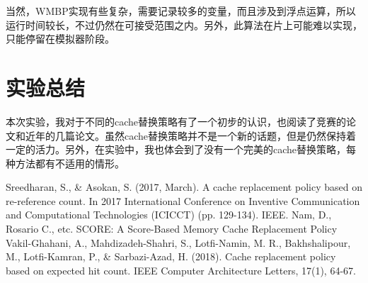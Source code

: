 \documentclass[utf8]{article}
\begin{document}
当然，WMBP实现有些复杂，需要记录较多的变量，而且涉及到浮点运算，所以运行时间较长，不过仍然在可接受范围之内。另外，此算法在片上可能难以实现，只能停留在模拟器阶段。

\section{实验总结}
本次实验，我对于不同的cache替换策略有了一个初步的认识，也阅读了竞赛的论文和近年的几篇论文。虽然cache替换策略并不是一个新的话题，但是仍然保持着一定的活力。另外，在实验中，我也体会到了没有一个完美的cache替换策略，每种方法都有不适用的情形。

\begin{thebibliography}{1}
     Sreedharan, S., \& Asokan, S. (2017, March). A cache replacement policy based on re-reference count. In 2017 International Conference on Inventive Communication and Computational Technologies (ICICCT) (pp. 129-134). IEEE.
      Nam, D., Rosario C., etc. SCORE: A Score-Based Memory Cache Replacement Policy
     Vakil-Ghahani, A., Mahdizadeh-Shahri, S., Lotfi-Namin, M. R., Bakhshalipour, M., Lotfi-Kamran, P., \& Sarbazi-Azad, H. (2018). Cache replacement policy based on expected hit count. IEEE Computer Architecture Letters, 17(1), 64-67.
\end{thebibliography}
\end{document}

